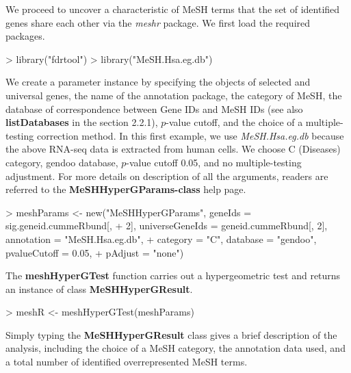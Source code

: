 \documentclass[11pt]{article}
\newcommand{\Rpackage}[1]{{\textit{#1}}}
\begin{document}
We proceed to uncover a characteristic of MeSH terms that the set of identified genes share each other via the \Rpackage{meshr} package. We first load the required packages.

\begin{center}
\begin{Schunk}
\begin{Sinput}
> library("fdrtool")
> library("MeSH.Hsa.eg.db")
\end{Sinput}
\end{Schunk}
\end{center}

We create a parameter instance by specifying the objects of selected and universal genes, the name of the annotation package, the category of MeSH, the database of correspondence between Gene IDs and MeSH IDs (see also \textbf{listDatabases} in the section 2.2.1), $p$-value cutoff, and the choice of a multiple-testing correction method.
In this first example, we use \Rpackage{MeSH.Hsa.eg.db} because the above RNA-seq data is extracted from human cells.
We choose C (Diseases) category, gendoo database, $p$-value cutoff 0.05, and no multiple-testing adjustment.
For more details on description of all the arguments, readers are referred to the \textbf{MeSHHyperGParams-class}
help page.

\begin{center}
\begin{Schunk}
\begin{Sinput}
> meshParams <- new("MeSHHyperGParams", geneIds = sig.geneid.cummeRbund[, 
+     2], universeGeneIds = geneid.cummeRbund[, 2], annotation = "MeSH.Hsa.eg.db", 
+     category = "C", database = "gendoo", pvalueCutoff = 0.05, 
+     pAdjust = "none")
\end{Sinput}
\end{Schunk}
\end{center}

The \textbf{meshHyperGTest} function carries out a hypergeometric test and returns an instance of class \textbf{MeSHHyperGResult}.

\begin{center}
\begin{Schunk}
\begin{Sinput}
> meshR <- meshHyperGTest(meshParams)
\end{Sinput}
\end{Schunk}
\end{center}

Simply typing the \textbf{MeSHHyperGResult} class gives a brief description of the analysis, including
the choice of a MeSH category, the annotation data used, and a total number of identified overrepresented MeSH terms.
\end{document}
